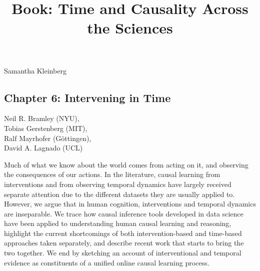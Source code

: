 \documentclass{article}%
\begin{document}
\title{Book: Time and Causality Across the Sciences}
\date{}\maketitle
\vspace{-1.5cm}
\begin{centering}
\Large{Samantha Kleinberg}\\
\end{centering}

\vspace{0.5cm}



\begin{centering}
\section*{Chapter 6: Intervening in Time}
\large{Neil R. Bramley (NYU),\\Tobias Gerstenberg (MIT),\\Ralf Mayrhofer (G{\"o}ttingen),\\David A. Lagnado (UCL)\\}
\end{centering}
\vspace{0.5cm}

\noindent Much of what we know about the world comes from acting on it, and observing the consequences of our actions. In the literature, causal learning from interventions and from observing temporal dynamics have largely received separate attention due to the different datasets they are usually applied to.  However, we argue that in human cognition, interventions and temporal dynamics are inseparable.  We trace how causal inference tools developed in data science have been applied to understanding human causal learning and reasoning, highlight the current shortcomings of both intervention-based and time-based approaches taken separately, and describe recent work that starts to bring the two together.  We end by sketching an account of interventional and temporal evidence as constituents of a unified online causal learning process.
\end{document}
